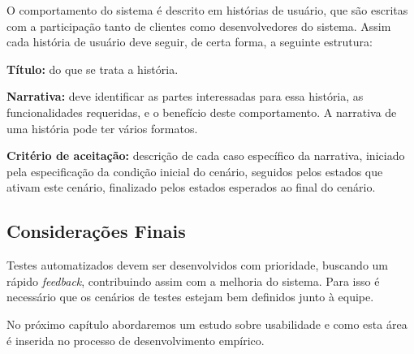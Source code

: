 O comportamento do sistema é descrito em histórias de usuário, que são 
escritas com a participação tanto de clientes como desenvolvedores do sistema. Assim 
cada história de usuário deve seguir, de certa forma, a seguinte estrutura:

\textbf{Título:} do que se trata a história.

\textbf{Narrativa:} deve identificar as partes interessadas para essa história, as 
funcionalidades requeridas, e o benefício deste comportamento. A narrativa de uma 
história pode ter vários formatos.

\textbf{Critério de aceitação:} descrição de cada caso específico da narrativa, 
iniciado pela especificação da condição inicial do cenário, seguidos pelos estados 
que ativam este cenário, finalizado pelos estados esperados ao final do cenário.


\subsection{Considerações Finais}

Testes automatizados devem ser desenvolvidos com prioridade, buscando um rápido 
\textit{feedback}, contribuindo assim com a melhoria do sistema. Para isso é 
necessário que os cenários de testes estejam bem definidos junto à equipe.

No próximo capítulo abordaremos um estudo sobre usabilidade e como esta área é inserida no processo de desenvolvimento empírico.

